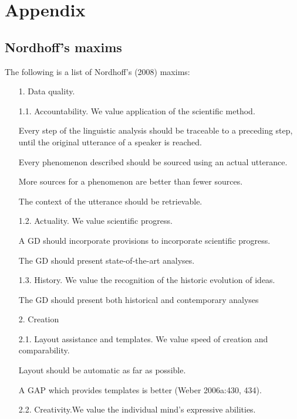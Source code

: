\appendix
\renewcommand\chapname{Appendix}	
\renewcommand\longchapname{Appendix}
\renewcommand\shortauthor{}
\renewcommand\longauthor{}
\chapter*{\longchapname} 
\mytoc{} 

\section*{Nordhoff's maxims}
The following is a list of Nordhoff's (2008) maxims:

\begin{enumerate}

\item[1.] Data quality.
\item[1.1.] Accountability. We value application of the scientific method.

\ea  Every step of the linguistic analysis should be traceable to a preceding step, until the original utterance of a speaker is reached. \z

\ea  Every phenomenon described should be sourced using an actual utterance. \z

\ea  More sources for a phenomenon are better than fewer sources.  \z

\ea  The context of the utterance should be retrievable.  \z

\item[1.2.] Actuality. We value scientific progress.

\ea  A GD should incorporate provisions to incorporate scientific progress. \z

\ea  The GD should present state-of-the-art analyses. \z

\item[1.3.] History. We value the recognition of the historic evolution of ideas.

\ea  The GD should present both historical and contemporary analyses  \z

\item[2.] Creation
\item[2.1.] Layout assistance and templates. We value speed of creation and comparability.

\ea  Layout should be automatic as far as possible. \z

\ea  A GAP which provides templates is better (Weber 2006a:430, 434). \z

\item[2.2.] Creativity.We value the individual mind's expressive abilities.


\end{enumerate}
